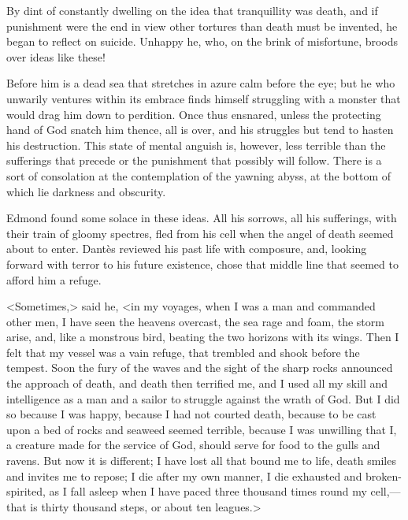  By dint of constantly dwelling on the idea that tranquillity was death, and if punishment were the end in view other tortures than death must be invented, he began to reflect on suicide. Unhappy he, who, on the brink of misfortune, broods over ideas like these! 

 Before him is a dead sea that stretches in azure calm before the eye; but he who unwarily ventures within its embrace finds himself struggling with a monster that would drag him down to perdition. Once thus ensnared, unless the protecting hand of God snatch him thence, all is over, and his struggles but tend to hasten his destruction. This state of mental anguish is, however, less terrible than the sufferings that precede or the punishment that possibly will follow. There is a sort of consolation at the contemplation of the yawning abyss, at the bottom of which lie darkness and obscurity. 

 Edmond found some solace in these ideas. All his sorrows, all his sufferings, with their train of gloomy spectres, fled from his cell when the angel of death seemed about to enter. Dantès reviewed his past life with composure, and, looking forward with terror to his future existence, chose that middle line that seemed to afford him a refuge. 

 <Sometimes,> said he, <in my voyages, when I was a man and commanded other men, I have seen the heavens overcast, the sea rage and foam, the storm arise, and, like a monstrous bird, beating the two horizons with its wings. Then I felt that my vessel was a vain refuge, that trembled and shook before the tempest. Soon the fury of the waves and the sight of the sharp rocks announced the approach of death, and death then terrified me, and I used all my skill and intelligence as a man and a sailor to struggle against the wrath of God. But I did so because I was happy, because I had not courted death, because to be cast upon a bed of rocks and seaweed seemed terrible, because I was unwilling that I, a creature made for the service of God, should serve for food to the gulls and ravens. But now it is different; I have lost all that bound me to life, death smiles and invites me to repose; I die after my own manner, I die exhausted and broken-spirited, as I fall asleep when I have paced three thousand times round my cell,—that is thirty thousand steps, or about ten leagues.> 

